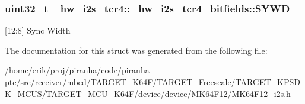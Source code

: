\subsubsection[{\texorpdfstring{S\+Y\+WD}{SYWD}}]{\setlength{\rightskip}{0pt plus 5cm}uint32\+\_\+t \+\_\+hw\+\_\+i2s\+\_\+tcr4\+::\+\_\+hw\+\_\+i2s\+\_\+tcr4\+\_\+bitfields\+::\+S\+Y\+WD}\hypertarget{struct__hw__i2s__tcr4_1_1__hw__i2s__tcr4__bitfields_aa84a6c13f920418f14a26c7ab0e2e91c}{}\label{struct__hw__i2s__tcr4_1_1__hw__i2s__tcr4__bitfields_aa84a6c13f920418f14a26c7ab0e2e91c}
\mbox{[}12\+:8\mbox{]} Sync Width 

The documentation for this struct was generated from the following file\+:\begin{DoxyCompactItemize}
\item 
/home/erik/proj/piranha/code/piranha-\/ptc/src/receiver/mbed/\+T\+A\+R\+G\+E\+T\+\_\+\+K64\+F/\+T\+A\+R\+G\+E\+T\+\_\+\+Freescale/\+T\+A\+R\+G\+E\+T\+\_\+\+K\+P\+S\+D\+K\+\_\+\+M\+C\+U\+S/\+T\+A\+R\+G\+E\+T\+\_\+\+M\+C\+U\+\_\+\+K64\+F/device/device/\+M\+K64\+F12/M\+K64\+F12\+\_\+i2s.\+h\end{DoxyCompactItemize}
